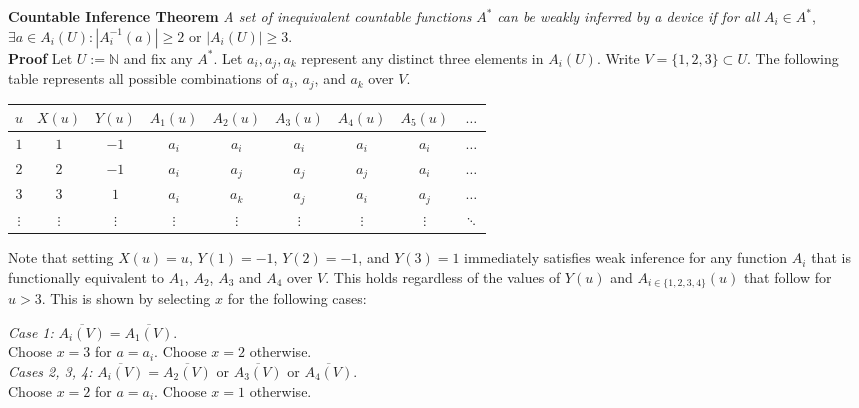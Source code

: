 \documentclass[11pt]{article}
\newcommand{\N}{\mathbb{N}}
\begin{document}
\bigskip
\newpage
\textbf{Countable Inference Theorem} \; \textit{A set of inequivalent countable functions} $ A^{*} $ \textit{can be weakly inferred by a device if for all} $ A_i \in A^{*} $,  $\exists a \in A_i(U) : |A_i^{-1}(a)| \geq 2 $ or $ |A_i(U)| \geq 3 $. \\

\textbf{Proof} \; Let $ U := \N $ and fix any $ A^{*} $. Let $ a_i, a_j, a_k $ represent any distinct three elements in $ A_i(U) $. Write $ V = \{1, 2, 3\} \subset U $. The following table represents all possible combinations of $ a_i $, $ a_j$, and $ a_k $ over $ V $. \\
 \begin{center}
 \begin{tabular}{ |c||c|c|c|c|c|c|c|c } 

 \hline
 $ u $ & $ X(u) $ & $Y(u)$ & $ A_1(u) $ & $ A_2(u) $ & $ A_3(u) $ & $ A_4(u) $ & $ A_5(u) $ & $ \dots $ \\ 
 \hline
 \hline
 $ 1 $ & $ 1 $ & $ -1 $ & $ a_i $ & $ a_i $ & $ a_i $ & $ a_i $ & $ a_i $ & $ \dots $ \\
 \hline
 $ 2 $ & $ 2 $ & $ -1 $ & $ a_i $ & $ a_j $ & $ a_j $ & $ a_j $ & $ a_i $ & $ \dots $ \\
 \hline
 $ 3 $ & $ 3 $ & $ 1 $ & $ a_i $ & $ a_k $ & $ a_j $ & $ a_i $ & $ a_j $ & $ \dots $ \\
 \hline
 $ \vdots $ & $ \vdots $ & $ \vdots $ & $ \vdots $ & $ \vdots $ & $ \vdots $ & $ \vdots $ & $ \vdots $ & $ \ddots $ \\
 \end{tabular} 
 \end{center}
\bigskip 
Note that setting $ X(u) = u $, $ Y(1) = -1 $, $ Y(2) = -1 $, and $ Y(3) = 1 $ immediately satisfies weak inference for any function $ A_i $ that is functionally equivalent to $ A_1 $, $ A_2 $, $ A_3 $ and $ A_4 $ over $ V $. This holds regardless of the values of $ Y(u) $ and $ A_{ i \in \{1, 2, 3, 4\} }(u) $ that follow for $ u > 3 $. This is shown by selecting $ x $ for the following cases:

\bigskip
\textit{Case 1:} $ \overline{A_i(V)} = \overline{A_1(V)} $. \\
 Choose $ x = 3 $ for $ a = a_i $. Choose $ x = 2 $ otherwise. \\

\textit{Cases 2, 3, 4:} $ \overline{A_i(V)} = \overline{A_2(V)} $ or  $ \overline{A_3(V)} $ or $ \overline{A_4(V)} $. \\
 Choose $ x = 2 $ for $ a = a_i $. Choose $ x = 1 $ otherwise. \\
\end{document}
